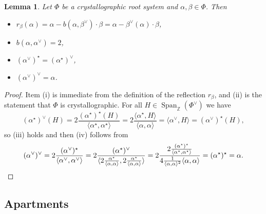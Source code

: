 \documentclass[12pt]{amsart}
\numberwithin{equation}{section}
\newtheorem{lemma}[theorem]{Lemma}
\theoremstyle{remark} %
\begin{document}
\begin{lemma}
	Let $\Phi$ be a crystallographic root system and $\alpha, \beta \in \Phi$. Then
	\begin{itemize}
		\item [(i)] $r_\beta(\alpha) = \alpha - b(\alpha, \beta^\vee) \cdot \beta 
		= \alpha - \beta^\vee(\alpha) \cdot \beta$,
		\item [(ii)]  $b(\alpha, \alpha^\vee) = 2$,
		\item [(iii)] $(\alpha^\vee)^\star = (\alpha^\star)^\vee$,
		\item [(iv)] $(\alpha^\vee)^\vee = \alpha$. 
	\end{itemize}
\end{lemma}
\begin{proof}
	Item (i) is immediate from the definition of the reflection $r_\beta$, and (ii) is the statement that $\Phi$ is crystallographic. For all $H \in \operatorname{Span}_{\mathbb{Z}}(\Phi^\vee)$ we have 
	$$
	(\alpha^\star)^\vee (H) = 2 \frac{(\alpha^\star)^\star(H)}{\langle \alpha^\star , \alpha^\star\rangle}
	= 2 \frac{\langle \alpha^\star, H \rangle }{\langle \alpha, \alpha \rangle} = \langle \alpha^\vee , H \rangle = (\alpha^\vee)^\star(H),
	$$
	so (iii) holds and then (iv) follows from
	\begin{equation*}
	(\alpha^\vee)^\vee = 2\frac{(\alpha^\vee)^\star}{\langle \alpha^\vee, \alpha^\vee\rangle} = 2 \frac{(\alpha^\star)^\vee}{\langle 2\frac{\alpha^\star}{\langle \alpha, \alpha \rangle }, 2\frac{\alpha^\star}{\langle \alpha, \alpha \rangle } \rangle}
	= 2\frac{ 2\frac{(\alpha^\star)^\star}{\langle \alpha^\star, \alpha^\star \rangle}}{4 \frac{1}{\langle \alpha ,\alpha \rangle^2}\langle \alpha, \alpha \rangle} = (\alpha^\star)^\star = \alpha. \qedhere
\end{equation*}
\end{proof}

	
	
	\subsection{Apartments}\label{sec:modelapartment}
	
\end{document}
